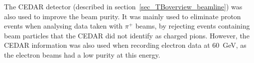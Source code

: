 The CEDAR detector (described in section~\ref{sec_TBoverview_beamline}) was also used to improve the beam purity. It was mainly used to eliminate proton events when analysing data taken with $\pi^+$ beams, by rejecting events containing beam particles that the CEDAR did not identify as charged pions. However, the CEDAR information was also used when recording electron data at 60~GeV, as the electron beams had a low purity at this energy.

%
%
%
%
%











%
%
%
%
%
%






%
%
%
%
%
%
%
%
%
%




